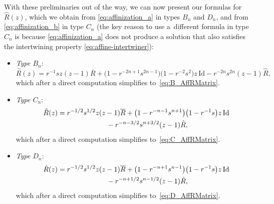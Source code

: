 \documentclass[10pt,a4paper]{amsart}
\numberwithin{equation}{section}
\newcommand{\Id}{\mathrm{Id}}
\begin{document}
With these preliminaries out of the way, we can now present our formulas for $\hat{R}(z)$, which we obtain from \eqref{eq:affinization_a} in types $B_{n}$ and $D_{n}$, and from \eqref{eq:affinization_b} in type $C_{n}$ (the key reason to use a~different formula in type $C_n$ is because \eqref{eq:affinization_a} does not produce a solution that also satisfies the intertwining property \eqref{eq:affine-intertwiner}):
\begin{itemize}\itemsep=0pt
\item
\emph{Type $B_n$}:
\begin{displaymath}
 \hat{R}(z) =
 r^{-1}sz(z - 1)\overline{R} + \bigl(1 - r^{-2n + 1}s^{2n - 1}\bigr)\bigl(1 - r^{-2}s^{2}\bigr)z\,\Id - r^{-2n}s^{2n}(z - 1)\hat{R},
\end{displaymath}
which after a direct computation simplifies to~\eqref{eq:B_AffRMatrix}.

\item
\emph{Type $C_n$}:
\begin{gather*}
 \hat{R}(z) =
 r^{-1/2}s^{1/2}z(z-1)\overline{R} + \bigl(1 - r^{-n-1}s^{n + 1}\bigr)\bigl(1 - r^{-1}s\bigr)z\,\Id \\
 \hphantom{\hat{R}(z) =}{}
 - r^{-n - 3/2}s^{n+ 3/2}(z - 1)\hat{R},
\end{gather*}
which after a direct computation simplifies to~\eqref{eq:C_AffRMatrix}.

\item
\emph{Type $D_n$}:
\begin{gather*}
 \hat{R}(z) =
 r^{-1/2}s^{1/2}z(z-1)\overline{R} + \bigl(1 - r^{-n+1}s^{n-1}\bigr)\bigl(1 - r^{-1}s\bigr)z\,\Id \\
 \hphantom{\hat{R}(z) =}{}
 - r^{-n+1/2}s^{n-1/2}(z - 1)\hat{R},
\end{gather*}
which after a direct computation simplifies to~\eqref{eq:D_AffRMatrix}.
\end{itemize}
\end{document}
